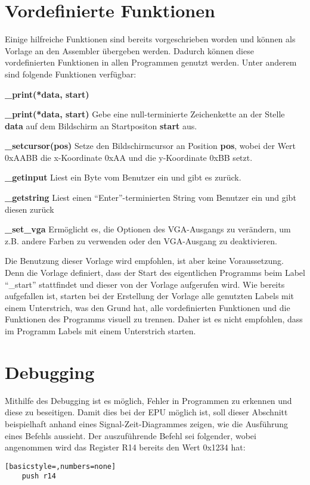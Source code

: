 \clearpage
\section{Vordefinierte Funktionen}
Einige hilfreiche Funktionen sind bereits vorgeschrieben worden und
können als Vorlage an den Assembler übergeben werden. Dadurch können diese
vordefinierten Funktionen in allen Programmen genutzt werden. Unter anderem sind
folgende Funktionen verfügbar:
\begin{labeling}{\textbf{\_print(*data, start)}}
\item [\textbf{\_print(*data, start)}] Gebe eine null-terminierte Zeichenkette an der
Stelle \textbf{data} auf dem Bildschirm an Startpositon \textbf{start}
aus.
\item [\textbf{\_setcursor(pos)}] Setze den Bildschirmcursor an Position \textbf{pos},
	wobei der Wert 0xAABB die x-Koordinate 0xAA und die y-Koordinate 0xBB setzt.
\item [\textbf{\_getinput}] Liest ein Byte vom Benutzer ein und gibt es zurück.
\item [\textbf{\_getstring}] Liest einen "`Enter"'-terminierten String vom Benutzer ein und
	gibt diesen zurück
\item [\textbf{\_set\_vga}] Ermöglicht es, die Optionen des VGA-Ausgangs zu verändern, um
	z.B. andere Farben zu verwenden oder den VGA-Ausgang zu deaktivieren.
\end{labeling}
Die Benutzung dieser Vorlage wird empfohlen, ist aber keine Voraussetzung. Denn
die Vorlage definiert, dass der Start des eigentlichen Programms beim Label
"`\_start"' stattfindet und dieser von der Vorlage aufgerufen wird. Wie
bereits aufgefallen ist, starten bei der Erstellung der Vorlage
alle genutzten Labels mit einem Unterstrich, was den Grund hat, alle
vordefinierten Funktionen und die Funktionen des Programms visuell zu trennen.
Daher ist es nicht empfohlen, dass im Programm Labels mit einem Unterstrich
starten.
\pagebreak
\section{Debugging}
Mithilfe des Debugging ist es möglich, Fehler in Programmen zu erkennen und
diese zu beseitigen. Damit dies bei der \ac{EPU} möglich ist, soll
dieser Abschnitt beispielhaft anhand eines Signal-Zeit-Diagrammes zeigen, wie die
Ausführung eines Befehls aussieht.
Der auszuführende Befehl sei folgender, wobei angenommen wird das Register R14
bereits den Wert 0x1234 hat:
\begin{lstlisting}[basicstyle=,numbers=none]
	push r14
\end{lstlisting}

